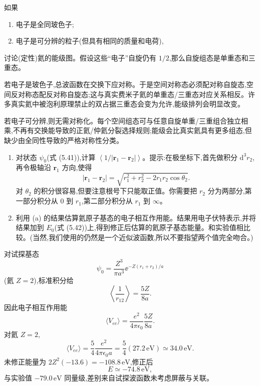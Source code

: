 \begin{question}
如果
\begin{enumerate}
\item 电子是全同玻色子;
\item 电子是可分辨的粒子(但具有相同的质量和电荷),
\end{enumerate}
讨论(定性)氦的能级图。假设这些“电子”自旋仍有 $1/2$,那么自旋组态是单重态和三重态。
\begin{solution}

若电子是玻色子,总波函数在交换下应对称。于是空间对称态必须配对称自旋态,空间反对称态配反对称自旋态;这与真实费米子氦的单重态/三重态对应关系相反。许多真实氦中被泡利原理禁止的双占据三重态会变为允许,能级排列会明显改变。

若电子可分辨,则无需对称化。每个空间组态可与任意自旋单重/三重组合独立相乘,不再有交换能导致的正氦/仲氦分裂选择规则;能级会比真实氦具有更多组态,但缺少由全同性导致的严格对称性分类。

\end{solution}
\end{question}

\begin{question}
\begin{enumerate}
\item 对状态 $\psi_0$(式 (5.41)),计算 $\left\langle 1/|\mathbf r_1-\mathbf r_2|\right\rangle$。提示:在极坐标下,首先做积分 $\mathrm d^3r_2$,再令极轴沿 $\mathbf r_1$ 方向,使得
\[
|\mathbf r_1-\mathbf r_2|=\sqrt{r_1^2+r_2^2-2r_1r_2\cos\theta_2}.
\]
对 $\theta_2$ 的积分很容易,但要注意根号下只能取正值。你需要把 $r_2$ 分为两部分,第一部分积分从 $0$ 到 $r_1$,第二部分积分从 $r_1$ 到 $\infty$。
\item 利用 (a) 的结果估算氦原子基态的电子相互作用能。结果用电子伏特表示,并将结果加到 $E_0$(式 (5.42))上,得到修正后估算的氦原子基态能量。和实验值相比较。(当然,我们使用的仍然是一个近似波函数,所以不要指望两个值完全吻合。)
\end{enumerate}

\par\smallskip
{}

\begin{solution}

对试探基态
\[
\psi_0=\frac{Z^3}{\pi a^3}\ee^{-Z(r_1+r_2)/a}
\]
(氦 $Z=2$),标准积分给
\[
\left\langle\frac1{r_{12}}\right\rangle=\frac{5Z}{8a}.
\]
因此电子相互作用能
\[
\langle V_{ee}\rangle=\frac{e^2}{4\pi\epsilon_0}\frac{5Z}{8a}.
\]
对氦 $Z=2$,
\[
\langle V_{ee}\rangle=\frac54\frac{e^2}{4\pi\epsilon_0a}=\frac54(27.2\,\mathrm{eV})\simeq34.0\,\mathrm{eV}.
\]
未修正能量为 $2Z^2(-13.6)=-108.8\,\mathrm{eV}$,修正后
\[
E\simeq -74.8\,\mathrm{eV},
\]
与实验值 $-79.0\,\mathrm{eV}$ 同量级,差别来自试探波函数未考虑屏蔽与关联。

\end{solution}
\end{question}


